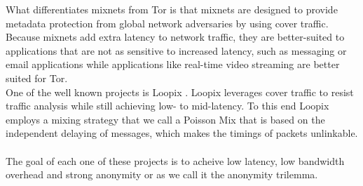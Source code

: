 What differentiates mixnets from Tor is that mixnets are designed to provide metadata protection from global network adversaries by using cover traffic. Because mixnets add extra latency to network traffic, they are better-suited to applications that are not as sensitive to increased latency, such as messaging or email applications while applications like real-time video streaming are better suited for Tor.
\\ One of the well known projects is Loopix \cite{loopix}. Loopix leverages cover traffic to resist traffic analysis while still achieving low- to mid-latency. To this end Loopix employs a mixing strategy that we call a Poisson Mix that is based on the independent delaying of messages, which makes the timings of packets unlinkable.
\\~\\ The goal of each one of these projects is to acheive low latency, low bandwidth overhead and strong anonymity or as we call it the anonymity trilemma. 

